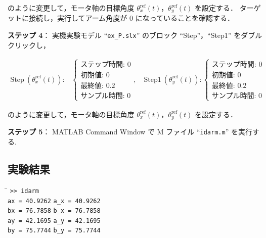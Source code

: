 のように変更して，モータ軸の目標角度 $\theta_x^{\mathrm{ref}}(t)$，$\theta_y^{\mathrm{ref}}(t)$ を設定する．
ターゲットに接続し，実行してアーム角度が $0$ になっていることを確認する．

\vspace{1em}
\noindent
\textbf{ステップ 4}：
実機実験モデル ``\texttt{ex\_P.slx}'' のブロック ``Step''，``Step1'' をダブルクリックし，

\[ 
\begin{array}{ll}
\text{Step}~(\theta_x^{\mathrm{ref}}(t))\!: &
\left\{
\begin{array}{l}
\text{ステップ時間: } 0 \\
\text{初期値: } 0 \\
\text{最終値: } 0.2 \\
\text{サンプル時間: } 0
\end{array}
\right., \quad
\text{Step1}~(\theta_y^{\mathrm{ref}}(t))\!: 
\left\{
\begin{array}{l}
\text{ステップ時間: } 0 \\
\text{初期値: } 0 \\
\text{最終値: } 0.2 \\
\text{サンプル時間: } 0
\end{array}
\right.
\end{array}
\]

のように変更して，モータ軸の目標角度 $\theta_x^{\mathrm{ref}}(t)$，$\theta_y^{\mathrm{ref}}(t)$ を設定する．

\noindent
\textbf{ステップ 5}： MATLAB Command Window で M ファイル ``\texttt{idarm.m}'' を実行する.

\subsection{実験結果}
\begin{tabbing}
\hspace{1cm}\=\kill
\> \texttt{>> idarm} \\
\> \texttt{ax = 40.9262} \hspace{6cm} \texttt{a\_x = 40.9262} \\
\> \texttt{bx = 76.7858} \hspace{6cm} \texttt{b\_x = 76.7858} \\
\> \texttt{ay = 42.1695} \hspace{6cm} \texttt{a\_y = 42.1695} \\
\> \texttt{by = 75.7744} \hspace{6cm} \texttt{b\_y = 75.7744}
\end{tabbing}

